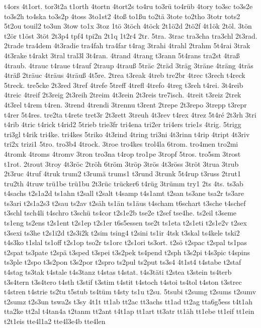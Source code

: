 {t4ors
4t1ort.
tor3t2a
t1orth
4tortn
4tort2s
to4ru
to3rü
to4rüb
4tory
to3sc
to3s2e
to3s2h
to4ska
to3s2p
4toss
3to1st2
4toß
to1ßu
to2tä
3tote
to2tho
3totr
tots2
5t2ou
touil2
to3un
3tow
to1x
3toz
1tö
3töch
4töck
2t1ö2d
2tö2f
4t1ök
2töl.
3tön
t2ör
t1öst
3töt
2t3p4
tpf4
tpi2n
2t1q
1t2r4
2tr.
5tra.
3trac
tra3cha
tra3chl
2t3rad.
2trade
tra4dem
4t3radie
tra4fah
tra4far
t4rag
3trahi
4trahl
2trahm
5t4rai
3trak
4t3rake
t4rakt
3tral
tral3l
3t4ran.
4trand
4trang
t3rann
5t4rans
tra2st
4traß
4traub.
4trauc
t4raue
t4rauf
2traup
4trauß
5träc
2träd
3träg
3träne
4träng
4träs
4träß
2träuc
4träus
4träuß
4t5re.
2trea
t3reak
4treb
tre2br
4trec
t3rech
t4reck
5treck.
tre5cke
2t3red
3tref
4trefe
5treff
4trefl
4trefo
4treg
t3reh
t4rei.
3t4reib
4treic
4treif
2t3reig
2t3reih
2treim
4t3rein
2t3reis
tre7isch.
4treit
t3reiz
2trek
4t3rel
t4rem
t4ren.
3trend
4trendi
3trennu
t3rent
2trepe
2t3repo
3trepp
t3repr
t4rer
5t4res.
tre2ta
t4rete
tret3r
2t3rett
3treuh
4t3rev
t4rex
4trez
5t4ré
2t3rh
3tri
t4rib
4tric
t4rick
t4rid2
5trieb
trie3fr
tri4ena
tri2er
tri4ers
trie1s
4trig.
5trigg
tri3gl
t4rik
tri4ke.
tri4kes
5triko
4t3rind
4tring
tri3ni
4t3rinn
t4rip
4tript
4t3riv
tri2x
trizi1
5tro.
tro3b4
4trock.
3troe
tro4kes
trol4la
6trom.
tro4men
tro2mi
4tromk
4troms
4tromv
3tron
tro3na
t4rop
tro1pe
3tropf
5tros.
tro5sm
3trost
t1rot.
2trout
3troy
4t3röc
2tröh
6tröm
3tröp
3trös
4t3röss
3tröt
3trua
3trub
2t3ruc
4truf
4truk
trum2
t3rumä
trums1
t3rund
3trunk
5t4rup
t3russ
2trut1
tru2th
4truw
trü1be
trü1bu
2t3rüc
trücker6
t4rüg
3trümm
try1
2ts
4ts.
ts3ab
t4sachs
t2s1a2d
ts1ahn
t2sall
t2salt
t4samp
t4s1amt
t2san
ts3ane
tsa2r
ts3are
ts3ari
t2s1a2s3
t2sau
ts2av
t2säh
ts1än
ts1äus
t4scham
t6schart
t3sche
t4schef
t3schl
tsch4li
t4schro
t3schü
ts4cor
t2s1e2b
tse2e
t2sef
tse4he.
ts2eil
t3seme
ts1eng
ts2ens
t2s1ent
t2s1ep
t2s1er
t6s5essen
tse2t
ts1eta
t2s1eti
t2s1e2v
t2sex
t3sexi
ts3he
t2s1i2d
t2s3i2k
t2sim
tsing4
t2sini
ts1ir
4tsk
t3skal
ts4kele
tski2
t4s3ko
t1slal
ts1off
t2s1op
tso2r
ts1orc
t2s1ori
ts3ort.
t2sö
t2spac
t2spal
ts1pas
t2spat
ts3pate
t2spä
t3sped
t3spei
t3s2pek
ts4pend
t2sph
t3s2pi
t4s3pic
t4spins
ts3ple
t2spo
t3s2pon
t3s2por
t2spro
ts2pul
ts2put
ts3s4
4t1st4
t4stabe
t2staf
t4stag
ts3tak
t4stale
t4s3tanz
t4stas
t4stat.
t4s3täti
t2stea
t3stein
ts4terb
t3s4tern
t3s4tero
t4sth
t3stif
t3stim
t4stit
t4stoch
t4stoi
ts4tol
t4ston
t3strec
t4stren
t4strie
ts2tu
t5stub
ts4tüm
t4sty
ts1u
t2su.
5tsubi
t2sumg
t2sums
t2sumv
t2sumz
t2s3un
tswa2s
t3sy
4t1t
tt1ab
tt2ac
tt3achs
tt1ad
tt2ag
tta6g5ess
t4t1ah
tta2ke
tt2al
t4tan4a
t2tanm
tt2ant
t4t1ap
tt1art
tt3atr
tt1äh
tt1ebe
tt1eif
tt1ein
t2t1eis
tte4l1a2
tte4l3e4b
tte4len
}
